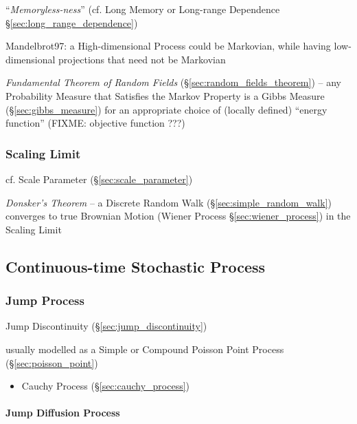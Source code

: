 ``\emph{Memoryless-ness}'' (cf. Long Memory or Long-range Dependence
\S\ref{sec:long_range_dependence})

Mandelbrot97: a High-dimensional Process could be Markovian, while having
low-dimensional projections that need not be Markovian

\emph{Fundamental Theorem of Random Fields} (\S\ref{sec:random_fields_theorem})
-- any Probability Measure that Satisfies the Markov Property is a Gibbs Measure
(\S\ref{sec:gibbs_measure}) for an appropriate choice of (locally defined)
``energy function'' (FIXME: objective function ???)



\subsubsection{Scaling Limit}\label{sec:scaling_limit}

cf. Scale Parameter (\S\ref{sec:scale_parameter})

\emph{Donsker's Theorem} -- a Discrete Random Walk
(\S\ref{sec:simple_random_walk}) converges to true Brownian Motion (Wiener
Process \S\ref{sec:wiener_process}) in the Scaling Limit



\subsection{Continuous-time Stochastic Process}\label{sec:continuous_stochastic}

\subsubsection{Jump Process}\label{sec:jump_process}

\fist Jump Discontinuity (\S\ref{sec:jump_discontinuity})

usually modelled as a Simple or Compound Poisson Point Process
(\S\ref{sec:poisson_point})

\begin{itemize}
  \item Cauchy Process (\S\ref{sec:cauchy_process})
\end{itemize}



\paragraph{Jump Diffusion Process}\label{sec:jump_diffusion}\hfill

